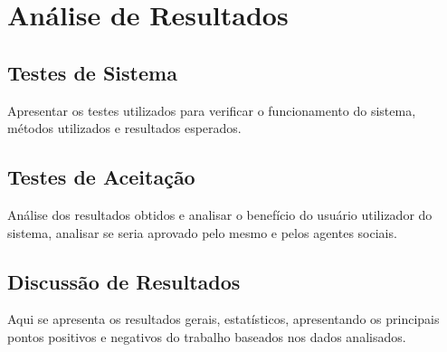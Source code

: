 \chapter{Análise de Resultados}
\label{chap:analiseresultados}
\section{Testes de Sistema}
\label{sec:testessistema}
Apresentar os testes utilizados para verificar o funcionamento do sistema, métodos utilizados e resultados esperados.

\section{Testes de Aceitação}
\label{sec:testesaceitacao}
Análise dos resultados obtidos e analisar o benefício do usuário utilizador do sistema, analisar se seria aprovado pelo mesmo e pelos agentes sociais.

\section{Discussão de Resultados}
\label{sec:discussãoresultados}
Aqui se apresenta os resultados gerais, estatísticos, apresentando os principais pontos positivos e negativos do trabalho baseados nos dados analisados.